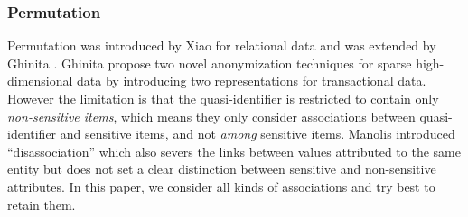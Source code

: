\subsubsection{Permutation}

Permutation was introduced by Xiao \etal \cite{Xiao:2006:Anatomy} for
relational data and was extended by
Ghinita \etal \cite{2011:TKDE:Anonymous}.
Ghinita \etal propose two novel anonymization techniques for sparse
high-dimensional data by introducing two representations for transactional
data. However the limitation is that the quasi-identifier is restricted to
contain only {\em non-sensitive items}, which means they only
consider associations between quasi-identifier
and sensitive items, and not {\em among} sensitive items.
Manolis \etal \cite{terrovitis:privacy} introduced ``disassociation''
which also severs the links between values attributed to the
same entity but does not
set a clear distinction between sensitive and non-sensitive attributes.
In this paper, we consider all kinds of associations and try best to
retain them.
%

